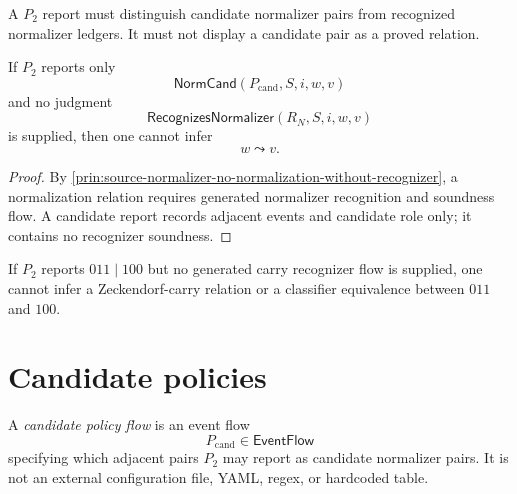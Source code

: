 \begin{principle}
\label{prin:source-normalizer-candidate-recognized-separated}
A $P_2$ report must distinguish candidate normalizer pairs from recognized normalizer ledgers. It must not display a candidate pair as a proved relation.
\end{principle}

\begin{theorem}
\label{thm:source-normalizer-candidate-not-relation}
If $P_2$ reports only
$$
  \mathsf{NormCand}(P_{\mathrm{cand}},S,i,w,v)
$$
and no judgment
$$
  \mathsf{RecognizesNormalizer}(R_N,S,i,w,v)
$$
is supplied, then one cannot infer
$$
  w\leadsto v.
$$
\end{theorem}

\begin{proof}
By \autoref{prin:source-normalizer-no-normalization-without-recognizer}, a normalization relation requires generated normalizer recognition and soundness flow. A candidate report records adjacent events and candidate role only; it contains no recognizer soundness.
\end{proof}

\begin{corollary}
\label{cor:source-normalizer-011-100-not-carry}
If $P_2$ reports $011\mid 100$ but no generated carry recognizer flow is supplied, one cannot infer a Zeckendorf-carry relation or a classifier equivalence between $011$ and $100$.
\end{corollary}

\section{Candidate policies}
\label{sec:source-normalizer-candidate-policies}

\begin{definition}
\label{def:source-normalizer-candidate-policy}
A \emph{candidate policy flow} is an event flow
$$
  P_{\mathrm{cand}}\in\mathsf{EventFlow}
$$
specifying which adjacent pairs $P_2$ may report as candidate normalizer pairs. It is not an external configuration file, YAML, regex, or hardcoded table.
\end{definition}

